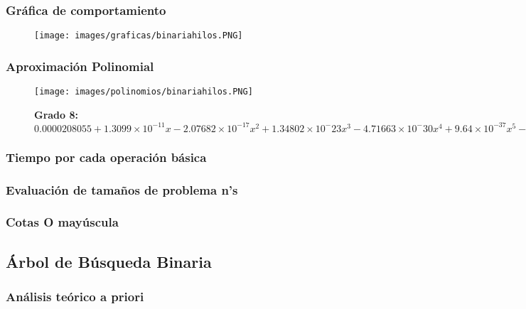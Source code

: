 \documentclass[12pt]{article}
\begin{document}
			\subsubsection{Gráfica de comportamiento}
				\begin{figure}[H]
			    	   \centering
			    	   \texttt{[image: images/graficas/binariahilos.PNG]}
			    \end{figure}
			
			\subsubsection{Aproximación Polinomial}
				\begin{figure}[H]
			    	   \centering
			    	   \texttt{[image: images/polinomios/binariahilos.PNG]}
			    	   \caption*{\textbf{Grado 8: $0.0000208055 + 1.3099\times10^{-11} x - 2.07682\times10^{-17} x^2 + 1.34802\times10^-{23} x^3 - 4.71663\times10^-30 x^4 + 9.64\times10^{-37} x^5 - 1.13965\times10^{-43} x^6 + 7.15912\times10^{-51} x^7 - 1.83887\times10^{-58} x^8$}}
			    \end{figure}
			
			\subsubsection{Tiempo por cada operación básica}
			
			\subsubsection{Evaluación de tamaños de problema n's}
			
			\subsubsection{Cotas O mayúscula}
		
\newpage


		\subsection{Árbol de Búsqueda Binaria}
			
			\subsubsection{Análisis teórico a priori}
			
\end{document}
